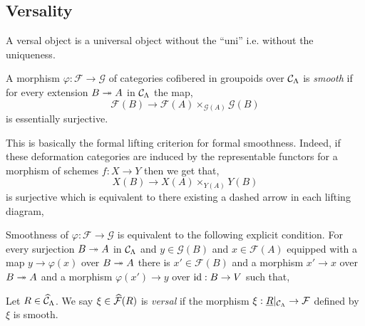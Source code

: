 \documentclass[12pt]{article}
\renewcommand{\F}{\mathcal{F}}
\renewcommand{\G}{\mathcal{G}}
\begin{document}
\subsection{Versality}

\begin{rmk}
A versal object is a universal object without the ``uni'' i.e. without the uniqueness. 
\end{rmk}

\begin{defn}
A morphism $\varphi : \F \to \G$ of categories cofibered in groupoids over $\mathcal{C}_\Lambda$ is \textit{smooth} if for every extension $B \twoheadrightarrow A$ in $\mathcal{C}_{\Lambda}$ the map,
\[ \F(B) \to \F(A) \times_{\G(A)} \G(B) \]
is essentially surjective.
\end{defn}

\begin{rmk}
This is basically the formal lifting criterion for formal smoothness. Indeed, if these deformation categories are induced by the representable functors for a morphism of schemes $f : X \to Y$ then we get that,
\[ X(B) \to X(A) \times_{Y(A)} Y(B) \]
is surjective which is equivalent to there existing a dashed arrow in each lifting diagram,
\begin{center}
\end{center} 
\end{rmk}

\begin{lemma}
Smoothness of $\varphi : \F \to \G$ is equivalent to the following explicit condition. For every surjection $B \twoheadrightarrow A$ in $\mathcal{C}_{\Lambda}$ and $y \in \G(B)$ and $x \in \F(A)$ equipped with a map $y \to \varphi(x)$ over $B \twoheadrightarrow A$ there is $x' \in \F(B)$ and a morphism $x' \to x$ over $B \twoheadrightarrow A$ and a morphism $\varphi(x') \to y$ over $\mathrm{id} : B \to V$ such that,
\begin{center}
\end{center}
\end{lemma}

\begin{defn}
Let $R \in \widehat{\mathcal{C}}_{\Lambda}$. We say $\xi \in \wh{\F}(R)$ is \textit{versal} if the morphism $\xi : \underline{R}|_{\C_\Lambda} \to \F$ defined by $\xi$ is smooth.
\end{defn}
\end{document}
